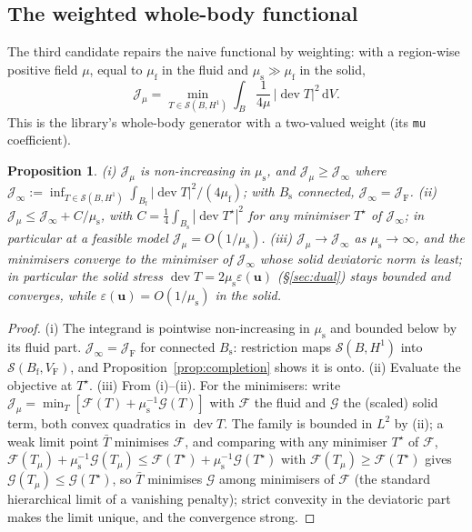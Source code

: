 \documentclass[11pt]{article}
\newtheorem{proposition}{Proposition}
\newcommand{\Jf}{\mathscr{J}}  %
\newcommand{\eps}{\varepsilon}
\newcommand{\Bs}{B_{\mathrm{s}}}
\newcommand{\Bf}{B_{\mathrm{f}}}
\newcommand{\bu}{\mathbf{u}}
\newcommand{\dV}{\,\mathrm{d}V}
\newcommand{\dev}{\operatorname{dev}}
\newcommand{\JF}{\Jf _{\mathrm{F}}}
\newcommand{\Jmu}{\Jf _{\mu}}
\begin{document}
\subsection{The weighted whole-body functional}
\label{sec:Jmu}

The third candidate repairs the naive functional by weighting: with a
region-wise positive field $\mu$, equal to $\mu_{\mathrm{f}}$ in the fluid
and $\mu_{\mathrm{s}} \gg \mu_{\mathrm{f}}$ in the solid,
\begin{equation}
  \Jmu = \min_{T \in \mathcal{S}(B, H^1)}
         \int_{B}\frac{1}{4\mu}\,|\dev T|^{2}\dV .
  \label{eq:Jmu}
\end{equation}
This is the library's whole-body generator with a two-valued weight
(its \texttt{mu} coefficient).

\begin{proposition}\label{prop:Jmu}
(i) $\Jmu$ is non-increasing in $\mu_{\mathrm{s}}$, and $\Jmu \ge \Jf _\infty$
where $\Jf _\infty := \inf_{T\in\mathcal{S}(B,H^1)}
\int_{\Bf}|\dev T|^2/(4\mu_{\mathrm{f}})$; with $\Bs$ connected,
$\Jf _\infty = \JF$.
(ii) $\Jmu \le \Jf _\infty + C/\mu_{\mathrm{s}}$, with
$C = \tfrac14\int_{\Bs}|\dev T^{\star}|^{2}$ for any minimiser $T^\star$
of $\Jf _\infty$; in particular at a feasible model
$\Jmu = O(1/\mu_{\mathrm{s}})$.
(iii) $\Jmu \to \Jf _\infty$ as $\mu_{\mathrm{s}} \to \infty$, and the
minimisers converge to the minimiser of $\Jf _\infty$ whose solid
deviatoric norm is least; in particular the solid stress
$\dev T = 2\mu_{\mathrm{s}}\eps(\bu)$ (\S\ref{sec:dual}) stays bounded
and converges, while $\eps(\bu) = O(1/\mu_{\mathrm{s}})$ in the solid.
\end{proposition}
\begin{proof}
(i) The integrand is pointwise non-increasing in $\mu_{\mathrm{s}}$ and
bounded below by its fluid part. $\Jf _\infty = \JF$ for connected $\Bs$:
restriction maps $\mathcal{S}(B,H^1)$ into $\mathcal{S}(\Bf,V_{\mathrm{F}})$,
and Proposition~\ref{prop:completion} shows it is onto.
(ii) Evaluate the objective at $T^\star$.
(iii) From (i)--(ii). For the minimisers: write $\Jmu = \min_T
[\mathcal{F}(T) + \mu_{\mathrm{s}}^{-1}\mathcal{G}(T)]$ with
$\mathcal{F}$ the fluid and $\mathcal{G}$ the (scaled) solid term, both
convex quadratics in $\dev T$. The family is bounded in $L^2$ by (ii); a
weak limit point $\bar T$ minimises $\mathcal{F}$, and comparing with any
minimiser $T^\star$ of $\mathcal{F}$,
$\mathcal{F}(T_\mu) + \mu_{\mathrm{s}}^{-1}\mathcal{G}(T_\mu) \le
\mathcal{F}(T^\star) + \mu_{\mathrm{s}}^{-1}\mathcal{G}(T^\star)$ with
$\mathcal{F}(T_\mu) \ge \mathcal{F}(T^\star)$ gives
$\mathcal{G}(T_\mu) \le \mathcal{G}(T^\star)$, so $\bar T$ minimises
$\mathcal{G}$ among minimisers of $\mathcal{F}$ (the standard
hierarchical limit of a vanishing penalty); strict convexity in the
deviatoric part makes the limit unique, and the convergence strong.
\end{proof}
\end{document}
